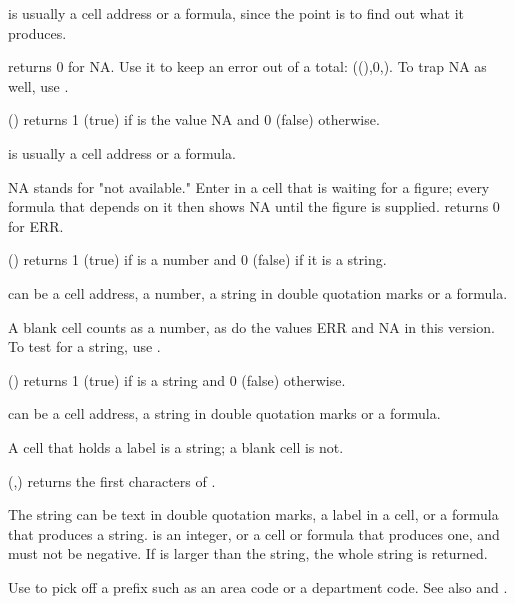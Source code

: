  is usually a cell address or a formula, since the point is to find out what it produces.

 returns 0 for NA. Use it to keep an error out of a total: ((),0,). To trap NA as well, use .

\Examples
{}

() returns 1 (true) if  is the value NA and 0 (false) otherwise.

 is usually a cell address or a formula.

NA stands for "not available." Enter  in a cell that is waiting for a figure; every formula that depends on it then shows NA until the figure is supplied.  returns 0 for ERR.

\Examples
{}

() returns 1 (true) if  is a number and 0 (false) if it is a string.

 can be a cell address, a number, a string in double quotation marks or a formula.

A blank cell counts as a number, as do the values ERR and NA in this version. To test for a string, use .

\Examples
{}

() returns 1 (true) if  is a string and 0 (false) otherwise.

 can be a cell address, a string in double quotation marks or a formula.

A cell that holds a label is a string; a blank cell is not.

\Examples
{}

(,) returns the first  characters of .

The string can be text in double quotation marks, a label in a cell, or a formula that produces a string.  is an integer, or a cell or formula that produces one, and must not be negative. If  is larger than the string, the whole string is returned.

Use  to pick off a prefix such as an area code or a department code. See also  and .

\Examples
{}

